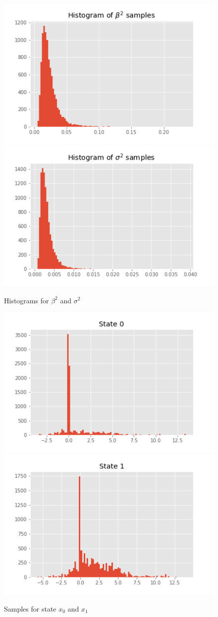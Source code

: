\documentclass[]{article}
\begin{document}
	\begin{figure}[H]
		\begin{center}
			
			\includegraphics[width=.4\textwidth]{task2/figures/T_2_2/Q2/plt_beta.png}
			\includegraphics[width=.4\textwidth]{task2/figures/T_2_2/Q2/plt_sigma.png}
			\caption*{Histograms for $\beta^2$ and $\sigma^2$}
		\end{center}
	\end{figure}
	\begin{figure}[H]
		\begin{center}
			
			
			\includegraphics[width=.4\textwidth]{task2/figures/T_2_2/Q2/plt_x0.png}
			\includegraphics[width=.4\textwidth]{task2/figures/T_2_2/Q2/plt_x1.png}
			
			\caption*{Samples for state $x_0$ and $x_1$}
		\end{center}
	\end{figure}
\end{document}
